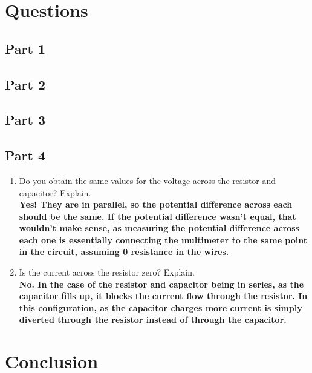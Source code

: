 \documentclass[titlepage]{article}
\begin{document}
	\section{Questions}


	\subsection{Part 1}

	\subsection{Part 2}

    \subsection{Part 3}
	
    \subsection{Part 4}
    \begin{enumerate}
        \item Do you obtain the same values for the voltage across the resistor and capacitor? Explain.\\ 
            \textbf{Yes! They are in parallel, so the potential difference across each should be the same. If the potential difference wasn’t equal, that wouldn’t make sense, as measuring the potential difference across each one is essentially connecting the multimeter to the same point in the circuit, assuming 0 resistance in the wires.}
        \item Is the current across the resistor zero? Explain.\\ 
            \textbf{No. In the case of the resistor and capacitor being in series, as the capacitor fills up, it blocks the current flow through the resistor. In this configuration, as the capacitor charges more current is simply diverted through the resistor instead of through the capacitor.}



    \end{enumerate}

	\section{Conclusion}
\end{document}
